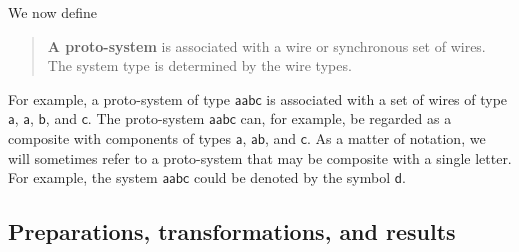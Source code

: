 \documentclass[10pt]{article}
\begin{document}
We now define
\begin{quote}
{\bf A proto-system} is associated with a wire or synchronous set of wires.  The system type is determined by the wire types.
\end{quote}
For example, a proto-system of type $\mathsf{ aabc}$ is associated with a set of wires of type $\mathsf a$, $\mathsf a$, $\mathsf b$, and $\mathsf c$.  The proto-system $\mathsf{aabc}$ can, for example, be regarded as a composite with components of types $\mathsf a$, $\mathsf{ab}$, and $\mathsf c$.  As a matter of notation, we will sometimes refer to a proto-system that may be composite with a single letter.  For example, the system $\mathsf{aabc}$ could be denoted by the symbol $\mathsf d$.






\subsection{Preparations, transformations, and results}\label{preparationstransformationseffects}
\end{document}

